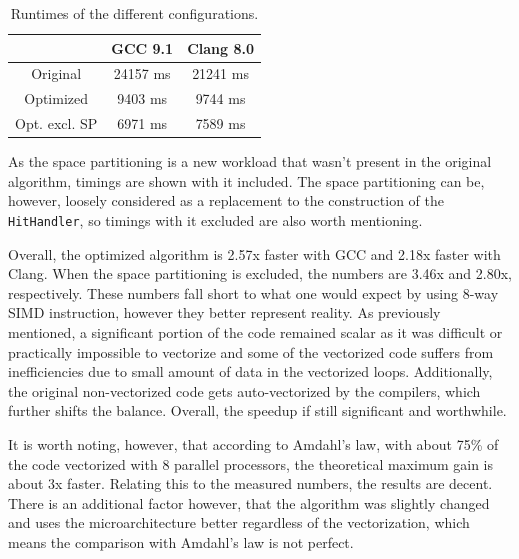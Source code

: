 \documentclass[12pt]{article}
\newcommand{\code}[1]{\texttt{#1}}
\begin{document}
\begin{table}[H]
	\centering
	\begin{tabular}{c | c | c}
		& GCC 9.1 & Clang 8.0 \\
		\hline
		Original & 24157 ms & 21241 ms \\
		\hline
		Optimized & 9403 ms & 9744 ms \\
		\hline
		Opt. excl. SP & 6971 ms & 7589 ms
	\end{tabular}
	\caption{Runtimes of the different configurations.}
	\label{tbl_runtimes_local}
\end{table}
	
As the space partitioning is a new workload that wasn't present in the original algorithm, timings are shown with it included. The space partitioning can be, however, loosely considered as a replacement to the construction of the \code{HitHandler}, so timings with it excluded are also worth mentioning.

Overall, the optimized algorithm is 2.57x faster with GCC and 2.18x faster with Clang. When the space partitioning is excluded, the numbers are 3.46x and 2.80x, respectively. These numbers fall short to what one would expect by using 8-way SIMD instruction, however they better represent reality. As previously mentioned, a significant portion of the code remained scalar as it was difficult or practically impossible to vectorize and some of the vectorized code suffers from inefficiencies due to small amount of data in the vectorized loops. Additionally, the original non-vectorized code gets auto-vectorized by the compilers, which further shifts the balance. Overall, the speedup if still significant and worthwhile.

It is worth noting, however, that according to Amdahl's law, with about 75\% of the code vectorized with 8 parallel processors, the theoretical maximum gain is about 3x faster. Relating this to the measured numbers, the results are decent. There is an additional factor however, that the algorithm was slightly changed and uses the microarchitecture better regardless of the vectorization, which means the comparison with Amdahl's law is not perfect.
\end{document}
